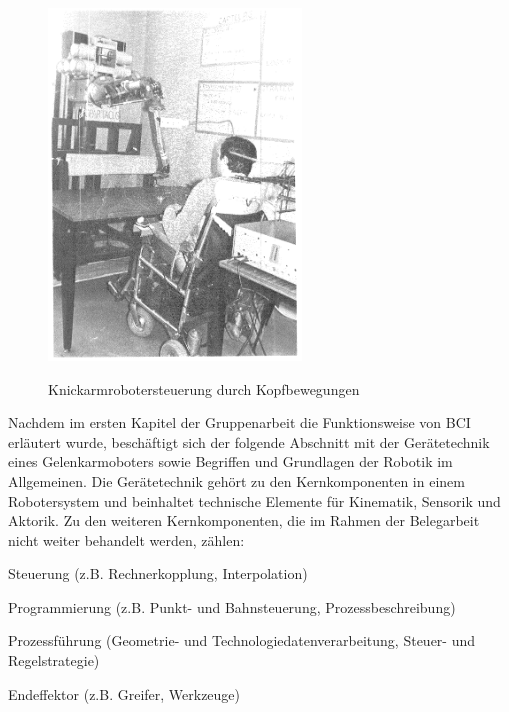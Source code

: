 \documentclass[11pt,ngerman,parskip=half]{scrartcl}
\begin{document}
\begin{figure}[H]
  \centering
  \includegraphics[width=0.6\textwidth]{src/img/john1.png}
  \caption{Knickarmrobotersteuerung durch Kopfbewegungen}
  \label{img:john1}
  \parencite[][84]{guittet_spartacus_1979}
\end{figure}
\newpage

Nachdem im ersten Kapitel der Gruppenarbeit die Funktionsweise von BCI
erläutert wurde, beschäftigt sich der folgende Abschnitt mit der
Gerätetechnik eines Gelenkarmoboters sowie Begriffen und Grundlagen der
Robotik im Allgemeinen. Die Gerätetechnik gehört zu den Kernkomponenten in
einem Robotersystem und beinhaltet technische Elemente für Kinematik,
Sensorik und Aktorik. Zu den weiteren Kernkomponenten, die im Rahmen der
Belegarbeit nicht weiter behandelt werden, zählen:
\begin{compactitem}
  \item Steuerung (z.B. Rechnerkopplung, Interpolation)
  \item Programmierung (z.B. Punkt- und Bahnsteuerung, Prozessbeschreibung)
  \item Prozessführung (Geometrie- und Technologiedatenverarbeitung, Steuer-
        und Regelstrategie)
  \item Endeffektor (z.B. Greifer, Werkzeuge)
\end{compactitem}
\parencite[vgl.][40]{hesse_taschenbuch_2016}
\end{document}
